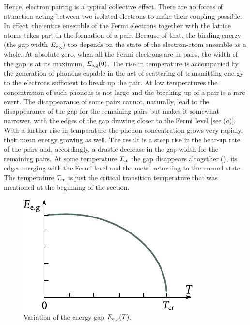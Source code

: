Hence, electron pairing is a typical collective effect. There are no forces of attraction acting between two isolated electrons to make their coupling possible. In effect, the entire ensemble of the Fermi electrons together with the lattice atoms takes part in the formation of a pair. Because of that, the binding energy (the gap width $E_{\text{e.g}}$) too depends on the state of the electron-atom ensemble as a whole. At absolute zero, when all the Fermi electrons are in pairs, the width of the gap is at its maximum, $E_{\text{e.g}}(0)$. The rise in temperature is accompanied by the generation of phonons capable in the act of scattering of transmitting energy to the electrons sufficient to break up the pair. At low temperatures the concentration of such phonons
is not large and the breaking up of a pair is a rare event. The disappearance of some pairs cannot, naturally, lead to the disappearance of the gap for the remaining pairs but makes it somewhat narrower,
with the edges of the gap drawing closer to the Fermi level [see (c)]. With a further rise in temperature the phonon concentration grows very rapidly, their mean energy growing as well. The result is a steep rise in the bear-up rate of the pairs and, accordingly, a drastic decrease in the gap width for the remaining pairs. At some temperature $T_{\text{cr}}$ the gap disappears altogether (), its edges merging with the Fermi level and the metal returning to the normal state. The temperature $T_{\text{cr}}$ is just the critical transition temperature that was mentioned at the beginning of the section.

\begin{figure}[t]
	\begin{center}
		\includegraphics[scale=1.0]{figures/ch_06/fig_6_34.pdf}
		\caption[]{Variation of the energy gap $E_{\text{e.g}}(T)$.}
		\label{fig:6_34}
	\end{center}
	\vspace{-0.7cm}
\end{figure}

